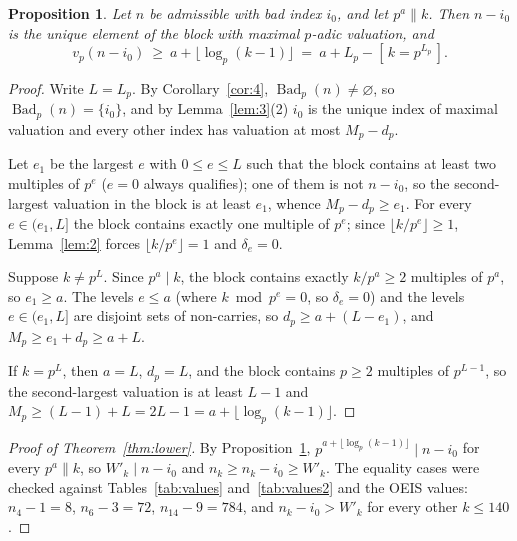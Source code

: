 \documentclass[11pt]{amsart}
\newtheorem{proposition}[theorem]{Proposition}
\theoremstyle{remark}
\DeclareMathOperator{\Bad}{Bad}
\begin{document}
\begin{proposition}\label{prop:5}
Let $n$ be admissible with bad index $i_0$, and let $p^a\|k$. Then $n-i_0$ is the unique element of the block with maximal $p$-adic valuation, and
\[v_p(n-i_0)\ \ge\ a+\lfloor\log_p(k-1)\rfloor\ =\ a+L_p-[\,k=p^{L_p}\,].\]
\end{proposition}
\begin{proof}
Write $L=L_p$. By Corollary~\ref{cor:4}, $\Bad_p(n)\ne\varnothing$, so $\Bad_p(n)=\{i_0\}$, and by Lemma~\ref{lem:3}(2) $i_0$ is the unique index of maximal valuation and every other index has valuation at most $M_p-d_p$.

Let $e_1$ be the largest $e$ with $0\le e\le L$ such that the block contains at least two multiples of $p^e$ ($e=0$ always qualifies); one of them is not $n-i_0$, so the second-largest valuation in the block is at least $e_1$, whence $M_p-d_p\ge e_1$. For every $e\in(e_1,L]$ the block contains exactly one multiple of $p^e$; since $\lfloor k/p^e\rfloor\ge1$, Lemma~\ref{lem:2} forces $\lfloor k/p^e\rfloor=1$ and $\delta_e=0$.

Suppose $k\ne p^L$. Since $p^a\mid k$, the block contains exactly $k/p^a\ge2$ multiples of $p^a$, so $e_1\ge a$. The levels $e\le a$ (where $k\bmod p^e=0$, so $\delta_e=0$) and the levels $e\in(e_1,L]$ are disjoint sets of non-carries, so $d_p\ge a+(L-e_1)$, and $M_p\ge e_1+d_p\ge a+L$.

If $k=p^L$, then $a=L$, $d_p=L$, and the block contains $p\ge2$ multiples of $p^{L-1}$, so the second-largest valuation is at least $L-1$ and $M_p\ge(L-1)+L=2L-1=a+\lfloor\log_p(k-1)\rfloor$.
\end{proof}

\begin{proof}[Proof of Theorem~\ref{thm:lower}]
By Proposition~\ref{prop:5}, $p^{a+\lfloor\log_p(k-1)\rfloor}\mid n-i_0$ for every $p^a\|k$, so $W'_k\mid n-i_0$ and $n_k\ge n_k-i_0\ge W'_k$. The equality cases were checked against Tables~\ref{tab:values} and~\ref{tab:values2} and the OEIS values: $n_4-1=8$, $n_6-3=72$, $n_{14}-9=784$, and $n_k-i_0>W'_k$ for every other $k\le140$.
\end{proof}
\end{document}
